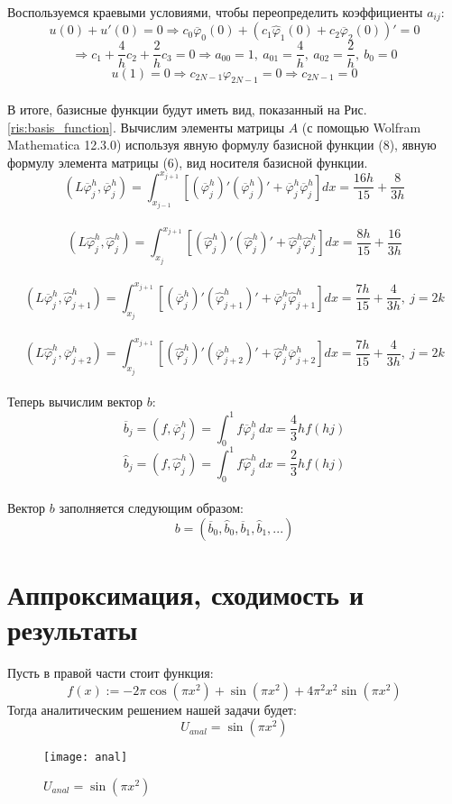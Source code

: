 \documentclass[12pt, a4paper]{article}
\begin{document}
	Воспользуемся краевыми условиями, чтобы переопределить коэффициенты $a_{ij}$:\\
	$$
		u(0) + u'(0) = 0 
		\Rightarrow c_0\overline{\varphi}_0(0) + 
			(c_1\widehat{\varphi}_1(0) + c_2\overline{\varphi}_2(0))' = 0
	$$
	$$
		\Rightarrow c_1 + \frac{4}{h}c_2 + \frac{2}{h}c_3 = 0
		\Rightarrow a_{00} = 1,\ a_{01} = \frac{4}{h},\ a_{02} = \frac{2}{h},\ b_{0} = 0
	$$
	$$
		u(1) = 0 
			\Rightarrow c_{2N-1}\varphi_{2N-1} = 0 
			\Rightarrow c_{2N-1} = 0
	$$\\
	В итоге, базисные функции будут иметь вид, 
	показанный на Рис. \ref{ris:basis_function}.
	Вычислим элементы матрицы $A$ 
	(с помощью Wolfram Mathematica 12.3.0) используя явную формулу базисной функции (8), 
	явную формулу элемента матрицы (6), вид носителя базисной функции.\\
	$$
		(L\overline{\varphi}_j^h, \overline{\varphi}_j^h) =
		\int_{x_{j-1}}^{x_{j+1}} [(\overline{\varphi}_j^h)'(\overline{\varphi}_j^h)' +
		\overline{\varphi}_j^h\overline{\varphi}_j^h]dx =
		\frac{16h}{15} + \frac{8}{3h}
	$$\\
	$$
		(L\widehat{\varphi}_j^h, \widehat{\varphi}_j^h) =
		\int_{x_{j}}^{x_{j+1}} [(\widehat{\varphi}_j^h)'(\widehat{\varphi}_j^h)' +
		\widehat{\varphi}_j^h\widehat{\varphi}_j^h]dx =
		\frac{8h}{15} + \frac{16}{3h}
	$$\\
	$$
		(L\overline{\varphi}_j^h, \widehat{\varphi}_{j+1}^h) =
		\int_{x_{j}}^{x_{j+1}} [(\overline{\varphi}_j^h)'(\widehat{\varphi}_{j+1}^h)' +
		\overline{\varphi}_j^h\widehat{\varphi}_{j+1}^h]dx =
		\frac{7h}{15} + \frac{4}{3h},\ j = 2k
	$$\\
	$$
		(L\widehat{\varphi}_j^h, \overline{\varphi}_{j+2}^h) =
		\int_{x_{j}}^{x_{j+1}} [(\widehat{\varphi}_j^h)'(\overline{\varphi}_{j+2}^h)' +
		\widehat{\varphi}_j^h\overline{\varphi}_{j+2}^h]dx =
		\frac{7h}{15} + \frac{4}{3h},\ j = 2k
	$$\\
	Теперь вычислим вектор $b$:
	$$
	\overline{b}_j = (f, \overline{\varphi}_j^h) = 
		\int_{0}^{1} f\overline{\varphi}_j^h \, dx =
		\frac{4}{3} hf(hj) 
	$$
	$$
	\widehat{b}_j = (f, \widehat{\varphi}_j^h) = 
		\int_{0}^{1} f\widehat{\varphi}_j^h \, dx = 
		\frac{2}{3} hf(hj)
	$$\\
	Вектор $b$ заполняется следующим образом:
	$$
		b = (\overline{b}_{0}, \widehat{b}_0, \overline{b}_1, \widehat{b}_1, ...)
	$$
	\vspace{0.5cm}
	\newpage
	
	\section{Аппроксимация, сходимость и результаты}
	\vspace{0.5cm}
	Пусть в правой части стоит функция:\\
	$$
		f(x) := -2\pi \cos (\pi x^2) + \sin (\pi x^2) + 4 \pi^2 x^2 \sin (\pi x^2)
	$$
	Тогда аналитическим решением нашей задачи будет:\\
	$$
		U_{anal} = \sin (\pi x^2)
	$$
	\begin{figure}[h]
		\texttt{[image: anal]}
		\caption{$U_{anal} = \sin (\pi x^2)$}
	\end{figure}
	
\end{document}

